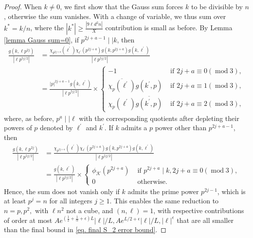\documentclass[11pt]{amsart}
\numberwithin{equation}{section}
\newcommand{\mymod}[1]{(\operatorname{mod} #1)}
\theoremstyle{remark}
\begin{document}
\begin{proof}
When $k\ne 0$, we first show that the Gauss sum forces $k$ to be divisible by $n$, otherwise the sum vanishes. With a change of variable, we thus sum over $k^*=k/n$, where the $|k^*|\ge \frac{|9\ell d^2 n|}{X}$ contribution is small as before.
By Lemma \ref{lemma Gauss sum=0}, if $p^{2j+a-1} \mid \mid k$, then
\begin{align*}
    \frac{g(k, \ell p^{2j})}{|\ell p^{5j/2}|} 
    &=
    \frac{\chi_{p^{2j+a}}(\ell^\prime)\chi_{\ell^\prime}(p^{2j+a})g(k, p^{2j+a})g(k, \ell^\prime)}{|\ell p^{5j/2}|}
    \\
    &=
    \frac{|p|^{2j+a-1}g(k, \ell^\prime)}{|\ell p^{5j/2}|}
    \times
    \begin{cases}
        -1 &\text{ if } 2j+a\equiv 0 \mymod{3},\\
        \overline{\chi_p(\ell^\prime)}g(k^\prime, p)   &\text{ if }    2j+a\equiv1\mymod{3},\\
        \chi_p(\ell^\prime)\overline{g(k^\prime, p)}   &\text{ if }    2j+a\equiv2\mymod{3},
    \end{cases}
\end{align*}
where, as before, $p^a\mid \mid \ell$ with the corresponding quotients after depleting their powers of $p$ denoted by $\ell^\prime$ and $k^\prime$. If $k$ admits a $p$ power other than $p^{2j+a-1}$, then
\begin{align*}
    \frac{g(k, \ell p^{2j})}{|\ell p^{5j/2}|} 
    &=
    \frac{\chi_{p^{2j+a}}(\ell^\prime)\chi_{\ell^\prime}(p^{2j+a})g(k, p^{2j+a})g(k, \ell^\prime)}{|\ell p^{5j/2}|}
    \\
    &=
    \frac{g(k, \ell^\prime)}{|\ell p^{5j/2}|}
    \times
    \begin{cases}
        \phi_\mathcal{K}(p^{2j+a}) &\text{ if } p^{2j+a}\mid k, 2j+a\equiv 0 \mymod{3},\\
        0 &\text{ otherwise}.
    \end{cases}
\end{align*}
Hence, the sum does not vanish only if $k$ admits the prime power $p^{2j-1}$, which is at least $p^j=n$ for all integers $j\ge 1.$ 
This enables the same reduction to $n=p, p^2,$ with $\ell n^2$ not a cube, and $(n, \ell)=1$, with respective contributions of order at most $Ae^{(\frac{1}{2}+\frac{1}{\alpha}+\epsilon)L}|\ell|/{L}, Ae^{L/2+\epsilon}|\ell|/{L}, |\ell|^\epsilon$ that are all smaller than the final bound in \eqref{eq. final S_2 error bound}.


\end{proof}
\end{document}
